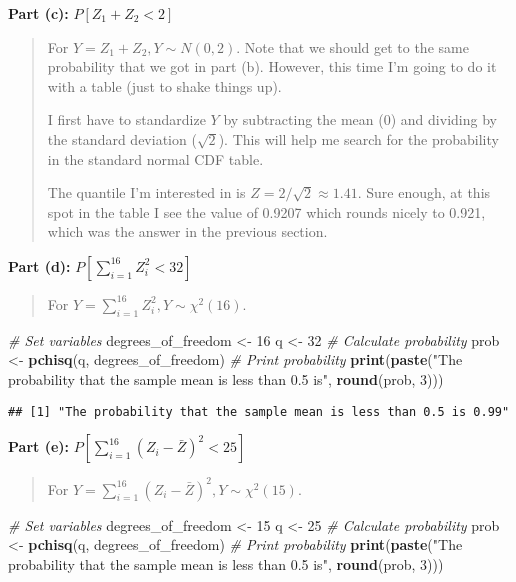 \documentclass[
]{article}
\newenvironment{Shaded}{\begin{snugshade}}{\end{snugshade}}
\newcommand{\CommentTok}[1]{\textcolor[rgb]{0.56,0.35,0.01}{\textit{#1}}}
\newcommand{\DecValTok}[1]{\textcolor[rgb]{0.00,0.00,0.81}{#1}}
\newcommand{\FunctionTok}[1]{\textcolor[rgb]{0.13,0.29,0.53}{\textbf{#1}}}
\newcommand{\NormalTok}[1]{#1}
\newcommand{\OtherTok}[1]{\textcolor[rgb]{0.56,0.35,0.01}{#1}}
\newcommand{\StringTok}[1]{\textcolor[rgb]{0.31,0.60,0.02}{#1}}
\begin{document}
\textbf{Part (c):} \(P[Z_1 + Z_2 < 2]\)

\begin{quote}
For \(Y = Z_1 + Z_2, Y \sim N(0, 2)\). Note that we should get to the
same probability that we got in part (b). However, this time I'm going
to do it with a table (just to shake things up).

I first have to standardize \(Y\) by subtracting the mean (0) and
dividing by the standard deviation (\(\sqrt{2}\)). This will help me
search for the probability in the standard normal CDF table.

The quantile I'm interested in is \(Z = 2/\sqrt{2} \approx 1.41\). Sure
enough, at this spot in the table I see the value of 0.9207 which rounds
nicely to 0.921, which was the answer in the previous section.
\end{quote}

\textbf{Part (d):} \(P[\sum_{i = 1}^{16} Z_i^2 < 32]\)

\begin{quote}
For \(Y = \sum_{i = 1}^{16} Z_i^2, Y \sim \chi^2(16)\).
\end{quote}

\begin{Shaded}
\begin{Highlighting}[]
\CommentTok{\# Set variables}
\NormalTok{degrees\_of\_freedom }\OtherTok{\textless{}{-}} \DecValTok{16}
\NormalTok{q }\OtherTok{\textless{}{-}} \DecValTok{32}
\CommentTok{\# Calculate probability}
\NormalTok{prob }\OtherTok{\textless{}{-}} \FunctionTok{pchisq}\NormalTok{(q, degrees\_of\_freedom)}
\CommentTok{\# Print probability}
\FunctionTok{print}\NormalTok{(}\FunctionTok{paste}\NormalTok{(}\StringTok{"The probability that the sample mean is less than 0.5 is"}\NormalTok{, }\FunctionTok{round}\NormalTok{(prob, }\DecValTok{3}\NormalTok{)))}
\end{Highlighting}
\end{Shaded}

\begin{verbatim}
## [1] "The probability that the sample mean is less than 0.5 is 0.99"
\end{verbatim}

\textbf{Part (e):} \(P[\sum_{i = 1}^{16} (Z_i - \bar{Z})^2 < 25]\)

\begin{quote}
For \(Y = \sum_{i = 1}^{16} (Z_i - \bar{Z})^2, Y \sim \chi^2(15)\).
\end{quote}

\begin{Shaded}
\begin{Highlighting}[]
\CommentTok{\# Set variables}
\NormalTok{degrees\_of\_freedom }\OtherTok{\textless{}{-}} \DecValTok{15}
\NormalTok{q }\OtherTok{\textless{}{-}} \DecValTok{25}
\CommentTok{\# Calculate probability}
\NormalTok{prob }\OtherTok{\textless{}{-}} \FunctionTok{pchisq}\NormalTok{(q, degrees\_of\_freedom)}
\CommentTok{\# Print probability}
\FunctionTok{print}\NormalTok{(}\FunctionTok{paste}\NormalTok{(}\StringTok{"The probability that the sample mean is less than 0.5 is"}\NormalTok{, }\FunctionTok{round}\NormalTok{(prob, }\DecValTok{3}\NormalTok{)))}
\end{Highlighting}
\end{Shaded}
\end{document}
